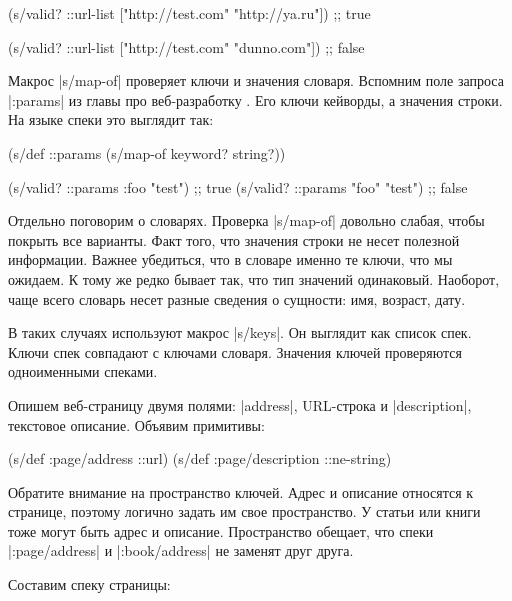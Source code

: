 \begin{english}
  \begin{clojure}
(s/valid? ::url-list ["http://test.com" "http://ya.ru"])
;; true

(s/valid? ::url-list ["http://test.com" "dunno.com"])
;; false
  \end{clojure}
\end{english}

Макрос \spverb|s/map-of| проверяет ключи и значения словаря. Вспомним поле
запроса \spverb|:params|  из главы про
веб-разработку . Его ключи кейворды, а значения строки. На
языке спеки это выглядит так:

\begin{english}
  \begin{clojure}
(s/def ::params
  (s/map-of keyword? string?))

(s/valid? ::params {:foo "test"})  ;; true
(s/valid? ::params {"foo" "test"}) ;; false
  \end{clojure}
\end{english}

Отдельно поговорим о словарях. Проверка \spverb|s/map-of| довольно слабая, чтобы
покрыть все варианты. Факт того, что значения строки не несет полезной
информации. Важнее убедиться, что в словаре именно те ключи, что мы ожидаем. К
тому же редко бывает так, что тип значений одинаковый. Наоборот, чаще всего
словарь несет разные сведения о сущности: имя, возраст, дату.

В таких случаях используют макрос \spverb|s/keys|. Он выглядит как список
спек. Ключи спек совпадают с ключами словаря. Значения ключей проверяются
одноименными спеками.

Опишем веб-страницу двумя полями: \spverb|address|, URL-строка и
\spverb|description|, текстовое описание. Объявим примитивы:

\begin{english}
  \begin{clojure}
(s/def :page/address ::url)
(s/def :page/description ::ne-string)
  \end{clojure}
\end{english}

Обратите внимание на пространство ключей. Адрес и описание относятся к странице,
поэтому логично задать им свое пространство. У статьи или книги тоже могут быть
адрес и описание. Пространство обещает, что спеки \spverb|:page/address| и
\spverb|:book/address| не заменят друг друга.

Составим спеку страницы:

